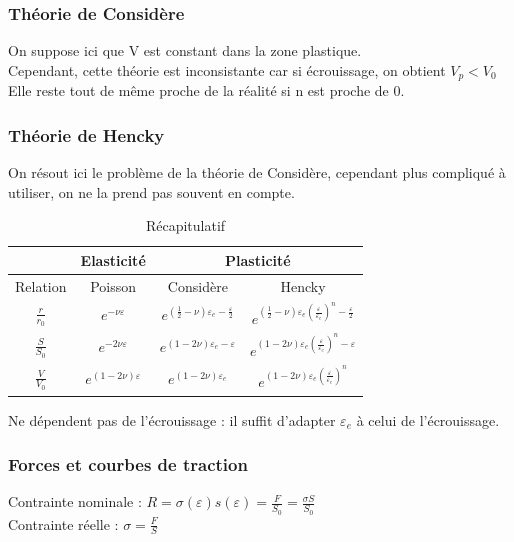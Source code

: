 \documentclass[../main.tex]{subfiles}
\begin{document}
\subsubsection{Théorie de Considère}
On suppose ici que V est constant dans la zone plastique.\\
Cependant, cette théorie est inconsistante car si écrouissage, on obtient $V_p < V_0$\\
Elle reste tout de même proche de la réalité si n est proche de 0.\\

\subsubsection{Théorie de Hencky}
On résout ici le problème de la théorie de Considère, cependant plus compliqué à utiliser, on ne la prend pas souvent en compte.


\begin{table}[hbt!]
    \centering
    \begin{tabular}{||c|c|c|c|}
    \hline
         & Elasticité & \multicolumn{2}{c|}{Plasticité}\\
         \hline
        Relation & Poisson & Considère & Hencky\\
        \hline
        $\frac{r}{r_0}$ & $e^{-\nu \varepsilon}$ & $e^{(\frac{1}{2}-\nu)\varepsilon_e - \frac{\varepsilon}{2}}$ & $e^{(\frac{1}{2}-\nu)\varepsilon_e(\frac{\varepsilon}{\varepsilon_e})^n - \frac{\varepsilon}{2}}$\\
        $\frac{S}{S_0}$ & $e^{-2\nu \varepsilon}$ & $e^{(1-2\nu)\varepsilon_e - \varepsilon}$ & $e^{(1-2\nu)\varepsilon_e (\frac{\varepsilon}{\varepsilon_e})^n - \varepsilon}$\\
        $\frac{V}{V_0}$ & $e^{(1-2\nu)\varepsilon}$ &$e^{(1-2\nu)\varepsilon_e}$ & $e^{(1-2\nu)\varepsilon_e (\frac{\varepsilon}{\varepsilon_e})^n}$\\
        \hline
    \end{tabular}
    \caption{Récapitulatif}
\end{table}
\warning Ne dépendent pas de l'écrouissage : il suffit d'adapter $\varepsilon_e$ à celui de l'écrouissage. \\

\subsubsection{Forces et courbes de traction}
Contrainte nominale : $R = \sigma(\varepsilon) s(\varepsilon) = \frac{F}{S_0} = \frac{\sigma S}{S_0}$\\
Contrainte réelle : $\sigma = \frac{F}{S}$\\
\end{document}

